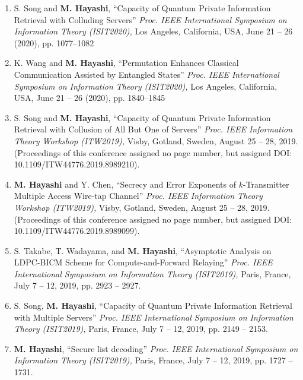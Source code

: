 \documentclass[a4paper,12pt,oneside]{article}
\begin{document}
\begin{enumerate}
    \item
    S. Song and \textbf{M. Hayashi}, 
    ``Capacity of Quantum Private Information Retrieval with Colluding Servers''
    {\em Proc. IEEE International Symposium on Information Theory (ISIT2020),} 
    Los Angeles, California, USA, June 21 -- 26 (2020), pp. 1077--1082
    
    \item
    K. Wang and \textbf{M. Hayashi}, 
    ``Permutation Enhances Classical Communication Assisted by Entangled States''
    {\em Proc. IEEE International Symposium on Information Theory (ISIT2020),} 
    Los Angeles, California, USA, June 21 -- 26 (2020), pp. 1840--1845
    
    
    \item
    S. Song and \textbf{M. Hayashi}, 
    ``Capacity of Quantum Private Information Retrieval with Collusion of All But One of Servers''
    {\em Proc. IEEE Information Theory Workshop (ITW2019),} 
    Visby, Gotland, Sweden, August 25 -- 28, 2019. 
    (Proceedings of this conference assigned no page number, but assigned DOI: 10.1109/ITW44776.2019.8989210).
    
    \item
    \textbf{M. Hayashi} and Y. Chen,
    ``Secrecy and Error Exponents of $k$-Transmitter Multiple Access Wire-tap Channel''
    {\em Proc. IEEE Information Theory Workshop (ITW2019),} 
    Visby, Gotland, Sweden, August 25 -- 28, 2019. 
    (Proceedings of this conference assigned no page number, but assigned DOI: 10.1109/ITW44776.2019.8989099).
    
    \item
    S. Takabe, T. Wadayama, and \textbf{M. Hayashi}, 
    ``Asymptotic Analysis on LDPC-BICM Scheme for Compute-and-Forward Relaying''
    {\em Proc. IEEE International Symposium on Information Theory (ISIT2019),} 
    Paris, France, July 7 -- 12, 2019, pp. 2923 -- 2927. 
    
    \item
    S. Song, \textbf{M. Hayashi}, 
    ``Capacity of Quantum Private Information Retrieval with Multiple Servers''
    {\em Proc. IEEE International Symposium on Information Theory (ISIT2019),} 
    Paris, France, July 7 -- 12, 2019, pp. 2149 -- 2153. 
    
    \item
    \textbf{M. Hayashi}, 
    ``Secure list decoding'' 
    {\em Proc. IEEE International Symposium on Information Theory (ISIT2019),} 
    Paris, France, July 7 -- 12, 2019, pp. 1727 -- 1731. 
    

\end{enumerate}
\end{document}
